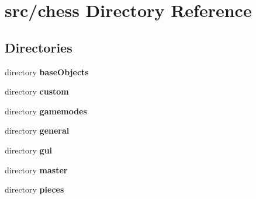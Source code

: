 \section{src/chess Directory Reference}
\label{dir_a469c1a447a1fbb4c350399e58cec756}
\subsection*{Directories}
\begin{DoxyCompactItemize}
\item 
directory {\bf base\+Objects}
\item 
directory {\bf custom}
\item 
directory {\bf gamemodes}
\item 
directory {\bf general}
\item 
directory {\bf gui}
\item 
directory {\bf master}
\item 
directory {\bf pieces}
\end{DoxyCompactItemize}
